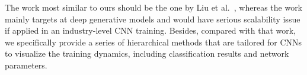 \documentclass[format=acmsmall, review=false, screen=true]{acmart}
\newcommand{\ti}{\textcolor[rgb]{0,0,0}}
\newcommand{\td}{\textcolor[rgb]{0,0,0}}
\begin{document}
\ti{The work most similar to ours should be the one by Liu et al.~\cite{liu2018analyzing}, whereas the work mainly targets at deep generative models and would have serious scalability issue if applied in an industry-level CNN training. Besides, compared with that work, we specifically provide a series of hierarchical methods that are tailored for CNNs to visualize the training dynamics, including classification results and network parameters. 
}%
\end{document}
